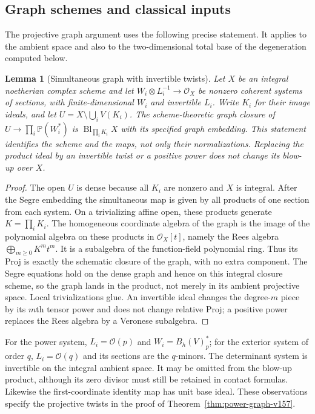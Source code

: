 \documentclass[11pt,reqno]{amsart}
\numberwithin{equation}{section}
\newtheorem{lemma}[theorem]{Lemma}
\theoremstyle{definition}\newtheorem{definition}[theorem]{Definition}
\theoremstyle{remark}\newtheorem{remark}[theorem]{Remark}
\newcommand{\Pj}{\mathbb P}\newcommand{\A}{\mathbb A}
\newcommand{\OO}{\mathcal O}\newcommand{\II}{\mathcal I}
\begin{document}
\subsection{Graph schemes and classical inputs}
The projective graph argument uses the following precise statement.
It applies to the ambient space and also to the two-dimensional total
base of the degeneration computed below.

\begin{lemma}[Simultaneous graph with invertible twists]
\label{lem:simultaneous-graph-v158}
Let $X$ be an integral noetherian complex scheme and let
$W_i\otimes L_i^{-1}\to\OO_X$ be nonzero coherent systems of
sections, with finite-dimensional $W_i$ and invertible $L_i$.
Write $K_i$ for their image ideals, and let
$U=X\setminus\bigcup_i V(K_i)$. The scheme-theoretic graph closure
of $U\to\prod_i\Pj(W_i^*)$ is
$\operatorname{Bl}_{\prod_iK_i}X$ with its specified graph embedding.
This statement identifies the scheme and the maps, not only their
normalizations. Replacing the product ideal by an invertible twist
or a positive power does not change its blow-up over $X$.
\end{lemma}
\begin{proof}
The open $U$ is dense because all $K_i$ are nonzero and $X$ is integral.
After the Segre embedding the simultaneous map is given by all products
of one section from each system. On a trivializing affine open, these
products generate $K=\prod_iK_i$. The homogeneous coordinate algebra
of the graph is the image of the polynomial algebra on these
products in $\OO_X[t]$, namely the Rees algebra
$\bigoplus_{m\geq0}K^m t^m$. It is a subalgebra of the function-field
polynomial ring. Thus its Proj is exactly the schematic closure of
the graph, with no extra component. The Segre equations hold on the
dense graph and hence on this integral closure scheme, so the graph
lands in the product, not merely in its ambient projective space.
Local trivializations glue. An invertible ideal changes the degree-$m$
piece by its $m$th tensor power and does not change relative Proj;
a positive power replaces the Rees algebra by a Veronese subalgebra.
\end{proof}

For the power system, $L_i=\OO(p)$ and $W_i=B_h(V)_p^*$;
for the exterior system of order $q$, $L_i=\OO(q)$ and its sections
are the $q$-minors. The determinant system is invertible on the
integral ambient space. It may be omitted from the blow-up product,
although its zero divisor must still be retained in contact formulas.
Likewise the first-coordinate identity map has unit base ideal.
These observations specify the projective twists in the proof of
Theorem~\ref{thm:power-graph-v157}.
\end{document}
